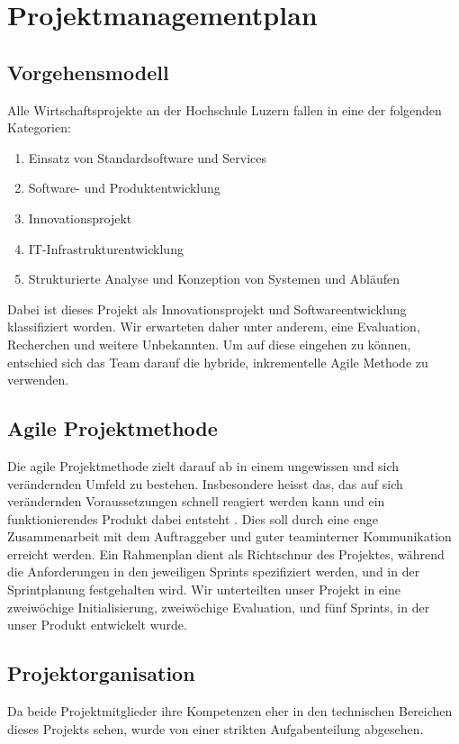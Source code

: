 \documentclass[a4paper]{scrreprt}
\begin{document}
\chapter{Projektmanagementplan}

\section{Vorgehensmodell}

Alle Wirtschaftsprojekte an der Hochschule Luzern fallen in eine der folgenden Kategorien:

\begin{enumerate}
	\item Einsatz von Standardsoftware und Services
	\item Software- und Produktentwicklung
	\item Innovationsprojekt
	\item IT-Infrastrukturentwicklung
	\item Strukturierte Analyse und Konzeption von Systemen und Abläufen
\end{enumerate}

Dabei ist dieses Projekt als Innovationsprojekt und Softwareentwicklung klassifiziert worden. Wir erwarteten daher unter anderem, eine Evaluation, Recherchen und weitere Unbekannten. Um auf diese eingehen zu können, entschied sich das Team darauf die hybride, inkrementelle Agile Methode zu verwenden.

\section{Agile Projektmethode}

Die agile Projektmethode zielt darauf ab in einem ungewissen und sich verändernden Umfeld zu bestehen. Insbesondere heisst das, das auf sich verändernden Voraussetzungen schnell reagiert werden kann und ein funktionierendes Produkt dabei entsteht \parencite{AgileAlliance2015}. Dies soll durch eine enge Zusammenarbeit mit dem Auftraggeber und guter teaminterner Kommunikation erreicht werden.
\bigbreak
Ein Rahmenplan dient als Richtschnur des Projektes, während die Anforderungen in den jeweiligen Sprints spezifiziert werden, und in der Sprintplanung festgehalten wird. Wir unterteilten unser Projekt in eine zweiwöchige Initialisierung, zweiwöchige Evaluation, und fünf Sprints, in der unser Produkt entwickelt wurde.

\section{Projektorganisation}
Da beide Projektmitglieder ihre Kompetenzen eher in den technischen Bereichen dieses Projekts sehen, wurde von einer strikten Aufgabenteilung abgesehen.
\end{document}
